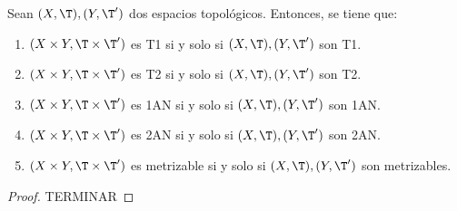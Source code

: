 \begin{prop}
    Sean $(X,\T), (Y,\T')$ dos espacios topológicos. Entonces, se tiene que:
    \begin{enumerate}
        \item $(X\times Y, \T\times \T')$ es T1 si y solo si $(X,\T), (Y,\T')$ son T1.
        \item $(X\times Y, \T\times \T')$ es T2 si y solo si $(X,\T), (Y,\T')$ son T2.
        \item $(X\times Y, \T\times \T')$ es 1AN si y solo si $(X,\T), (Y,\T')$ son 1AN.
        \item $(X\times Y, \T\times \T')$ es 2AN si y solo si $(X,\T), (Y,\T')$ son 2AN.
        \item $(X\times Y, \T\times \T')$ es metrizable si y solo si $(X,\T), (Y,\T')$ son metrizables.
    \end{enumerate}
\end{prop}
\begin{proof}
TERMINAR
\begin{comment}
     Hacia la derecha, se usa que esas propiedades son hereditarias. Es consecuencia de la proposición anterior.

    Las de 1AN y 2AN ya están demostradas.
\end{comment}
\end{proof}


